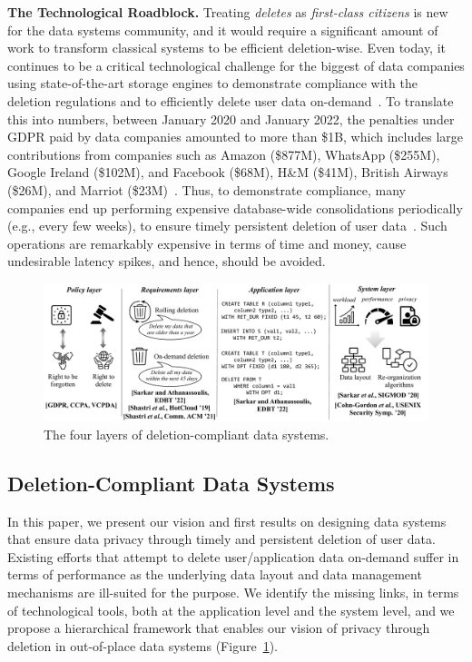 \documentclass[11pt,dvipdfmx]{article}
\newcommand\Paragraph[1]{\vspace{0.02in}  \noindent \textbf{#1.}}
\begin{document}
\Paragraph{The Technological Roadblock} Treating \emph{deletes} as \textit{first-class citizens} is new for the data systems community, and it would require a significant amount of work to transform classical systems to be efficient deletion-wise. 
Even today, it continues to be a critical technological challenge for the biggest of data companies using state-of-the-art storage engines to demonstrate compliance with the deletion regulations and to efficiently delete user data on-demand~\cite{Shah2019,Shastri2020,Shastri2021}. 
To translate this into numbers, between January 2020 and January 2022, the penalties under GDPR paid by data companies amounted to more than \$1B, which includes large contributions from companies such as Amazon (\$877M), WhatsApp (\$255M), Google Ireland (\$102M), and Facebook (\$68M), H\&M (\$41M), British Airways (\$26M), and Marriot (\$23M)~\cite{Piper2022,DLAPiper2020,Tessian2022}. 
Thus, to demonstrate compliance, many companies end up performing expensive database-wide consolidations periodically (e.g., every few weeks), to ensure timely persistent deletion of user data~\cite{Sarkar2020,Sarkar2021c}. 
Such operations are remarkably expensive in terms of time and money, cause undesirable latency spikes, and hence, should be avoided. 

\begin{figure}[tb]
    \centering
        \includegraphics[scale=0.29]{figs/layered_problem_scenario.pdf}
    \vspace{-0.25in} 
    \caption{The four layers of deletion-compliant data systems.}
     \vspace{-0.1in}
    \label{fig: vision}
\end{figure}

 
\subsection{Deletion-Compliant Data Systems}
In this paper, we present our vision and first results on designing data systems that ensure data privacy through timely and persistent deletion of user data. 
Existing efforts that attempt to delete user/application data on-demand suffer in terms of performance as the underlying data layout and data management mechanisms are ill-suited for the purpose. 
We identify the missing links, in terms of technological tools, both at the application level and the system level, and we propose a hierarchical framework that enables our vision of privacy through deletion in out-of-place data systems (Figure~\ref{fig: vision}).
\end{document}
